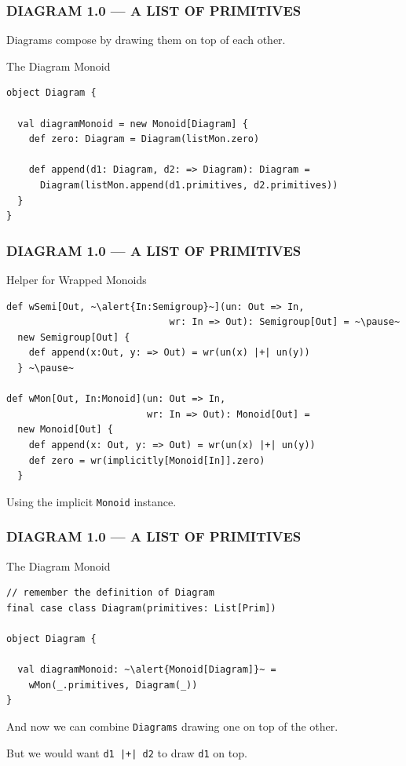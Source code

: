 \documentclass{beamer}
\begin{document}
\begin{frame}[fragile] \frametitle{DIAGRAM 1.0 --- A LIST OF PRIMITIVES}
Diagrams compose by drawing them on top of each other.
  \begin{block}{The Diagram Monoid}
  \begin{lstlisting}
object Diagram {

  val diagramMonoid = new Monoid[Diagram] {
    def zero: Diagram = Diagram(listMon.zero)

    def append(d1: Diagram, d2: => Diagram): Diagram =
      Diagram(listMon.append(d1.primitives, d2.primitives))
  }
}
  \end{lstlisting}
  \end{block}
\end{frame}

\begin{frame}[fragile] \frametitle{DIAGRAM 1.0 --- A LIST OF PRIMITIVES}
  \begin{block}{Helper for Wrapped Monoids}
  \begin{lstlisting}
def wSemi[Out, ~\alert{In:Semigroup}~](un: Out => In,
                             wr: In => Out): Semigroup[Out] = ~\pause~
  new Semigroup[Out] {
    def append(x:Out, y: => Out) = wr(un(x) |+| un(y))
  } ~\pause~

def wMon[Out, In:Monoid](un: Out => In,
                         wr: In => Out): Monoid[Out] =
  new Monoid[Out] {
    def append(x: Out, y: => Out) = wr(un(x) |+| un(y))
    def zero = wr(implicitly[Monoid[In]].zero)
  }
  \end{lstlisting}
  \end{block}
Using the implicit \texttt{Monoid} instance.
\end{frame}

\begin{frame}[fragile] \frametitle{DIAGRAM 1.0 --- A LIST OF PRIMITIVES}
  \begin{block}{The Diagram Monoid}
  \begin{lstlisting}
// remember the definition of Diagram
final case class Diagram(primitives: List[Prim])

object Diagram {

  val diagramMonoid: ~\alert{Monoid[Diagram]}~ =
    wMon(_.primitives, Diagram(_))
}
  \end{lstlisting}
  \end{block}

  And now we can combine \texttt{Diagrams} drawing one on top of the other.

  But we would want \alert{\texttt{d1 |+| d2} to draw \texttt{d1} on top.}
\end{frame}
\end{document}
